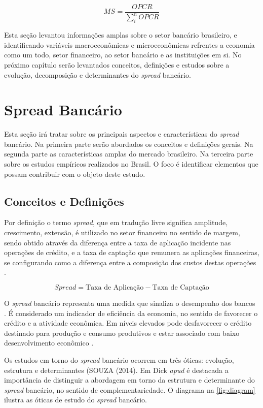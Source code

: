 \documentclass[12pt,12pt,openright,oneside,a4paper,chapter=TITLE,section=TITLE,subsection=TITLE,subsubsection=TITLE,english,french,spanish,portugues,sumario=tradicional]{abntex2}
\begin{document}
\[
MS_{} = \frac{OPCR_{}}{\sum_{i}^{n}OPCR_{}} 
\]

Esta seção levantou informações amplas sobre o setor bancário brasileiro, e
identificando variáveis macroeconômicas e microeconômicas refrentes a economia como um todo, setor financeiro, ao setor bancário e as instituições em si. No próximo capítulo serão levantados conceitos, definições e estudos sobre a evolução, decomposição e determinantes do \emph{spread} bancário.

\textual
\pagestyle{simple}

\section{Spread Bancário}

Esta seção irá tratar sobre os principais aspectos e características do
\emph{spread} bancário. Na primeira parte serão abordados os conceitos e definições
gerais. Na segunda parte as características amplas do mercado brasileiro. Na
terceira parte sobre os estudos empíricos realizados no Brasil. O foco é
identificar elementos que possam contribuir com o objeto deste estudo.

\subsection{Conceitos e Definições}

Por definição o termo \emph{spread}, que em tradução livre significa amplitude, crescimento, extensão, é utilizado no setor financeiro no sentido de margem, sendo obtido através da diferença entre a taxa de aplicação incidente nas operações de crédito, e a taxa de captação que remunera as aplicações financeiras, se configurando como a diferença entre a composição dos custos destas operações \cite{BCB:2000}.

\[
Spread = \text{Taxa de Aplicação} - \text{Taxa de Captação}
\]

O \emph{spread} bancário representa uma medida que sinaliza o desempenho dos bancos
\cite{levine:1997}. É considerado um indicador de eficiência da economia, no
sentido de favorecer o crédito e a atividade econômica. Em níveis elevados pode
desfavorecer o crédito destinado para produção e consumo produtivos e estar
associado com baixo desenvolvimento econômico \cite{WB:2005}.

Os estudos em torno do \emph{spread} bancário ocorrem em três óticas: evolução,
estrutura e determinantes (SOUZA (2014). Em Dick \emph{apud} \cite{leal:2006} é
destacada a importância de distinguir a abordagem em torno da estrutura e
determinante do \emph{spread} bancário, no sentido de complementariedade. O diagrama
na \autoref{fig:diagram} ilustra as óticas de estudo do \emph{spread} bancário.
\end{document}
